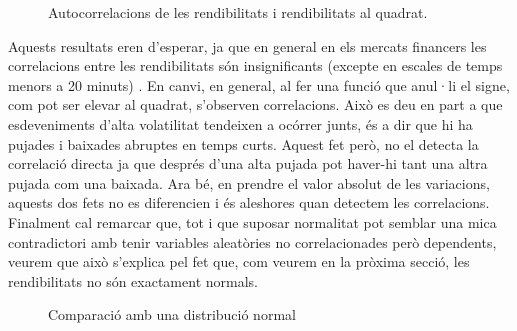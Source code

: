 \documentclass{article}
\numberwithin{table}{section}
\numberwithin{figure}{section}
\numberwithin{equation}{section}
\begin{document}
\begin{figure}[H]
  \caption{Autocorrelacions de les rendibilitats i rendibilitats al quadrat.}
\end{figure}
Aquests resultats eren d'esperar, ja que en general en els mercats financers les correlacions entre les rendibilitats són insignificants (excepte en escales de temps menors a 20 minuts) \cite{20}.
En canvi, en general, al fer una funció que anul·li el signe, com pot ser elevar al quadrat, s’observen correlacions. Això es deu en part a que esdeveniments d’alta volatilitat tendeixen a ocórrer junts, és a dir que hi ha pujades i baixades abruptes en temps curts. Aquest fet però, no el detecta la correlació directa ja que després d’una alta pujada pot haver-hi tant una altra pujada com una baixada. Ara bé, en prendre el valor absolut de les variacions, aquests dos fets no es diferencien i és aleshores quan detectem les correlacions.
Finalment cal remarcar que, tot i que suposar normalitat pot semblar una mica contradictori amb tenir variables aleatòries no correlacionades però dependents, veurem que això s’explica pel fet que, com veurem en la pròxima secció, les rendibilitats no són exactament normals.


\begin{figure}[H]
	\centering \sffamily \small
	
	\caption{Comparació amb una distribució normal}
	\label{fig:comparacio normal}
\end{figure}
\end{document}
